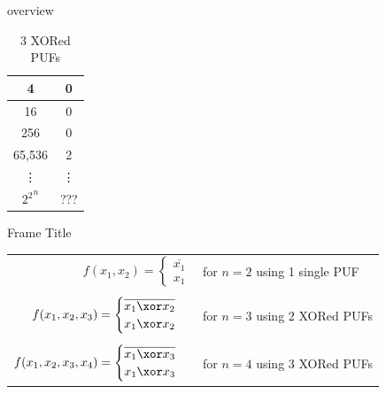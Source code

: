 \documentclass[10pt, compress]{beamer}
\begin{document}
\begin{frame}{overview}
\begin{table}[H]
\begin{subtable}{0.23\textwidth}
\begin{tabular}{|c|c|}
            4         & 0         \\ \hline
            16        & 0         \\ \hline
            256       & 0         \\ \hline
            65,536    & 2         \\ \hline
            \vdots    & \vdots    \\ \hline
            ${2^2}^n$ & ???       \\ \hline
            \end{tabular}
            \caption{3 XORed PUFs}
        \end{subtable}
    \end{table}
\end{frame}


\begin{frame}{Frame Title}
    \begin{table}[H]
        \centering
        \begin{tabular}{r l}
             $f(x_1,x_2) =  \begin{cases} 
                                    \overline{x_1}\\ 
                                    x_1
                                \end{cases}$ &  for $n=2$ using 1 single PUF \\
                                &\\
             $f(x_1,x_2,x_3) =  \begin{cases} 
                                    \overline{x_1 \xor x_2}\\ 
                                    x_1 \xor x_2
                                \end{cases}$ & for $n = 3$ using 2 XORed PUFs \\
                                &\\
             $f(x_1,x_2,x_3,x_4) =  \begin{cases} 
                                    \overline{x_1 \xor x_3}\\ 
                                    x_1 \xor x_3
                                \end{cases}$ & for $n = 4$ using 3 XORed PUFs
                                
        \end{tabular}
    \end{table}  
\end{frame}
\end{document}
